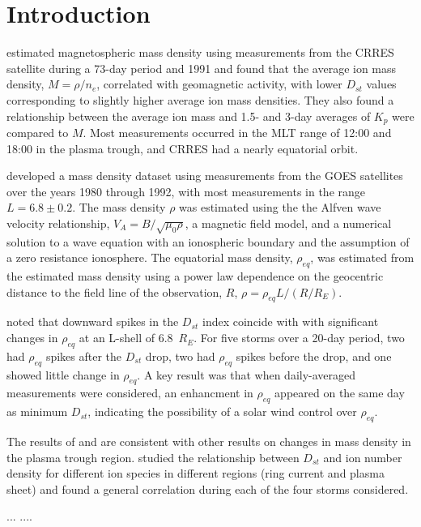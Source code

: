 \documentclass[10pt,twocolumn]{article}
\begin{document}
\section{Introduction}

\cite{Takahashi2006} estimated magnetospheric mass density using measurements from the CRRES satellite during a 73-day period and 1991 and found that the average ion mass density, $M=\rho/n_e$, correlated with geomagnetic activity, with lower $D_{st}$ values corresponding to slightly higher average ion mass densities.  They also found a relationship between the average ion mass and 1.5- and 3-day averages of $K_p$ were compared to $M$.  Most measurements occurred in the MLT range of 12:00 and 18:00 in the plasma trough, and CRRES had a nearly equatorial orbit.

\cite{Takahashi2010} developed a mass density dataset using measurements from the GOES satellites over the years 1980 through 1992, with most measurements in the range $L=6.8\pm0.2$. The mass density $\rho$ was estimated using the the Alfven wave velocity relationship, $V_A=B/\sqrt{\mu_0\rho}$, a magnetic field model, and a numerical solution to a wave equation with an ionospheric boundary and the assumption of a zero resistance ionosphere.  The equatorial mass density, $\rho_{eq}$, was estimated from the estimated mass density using a power law dependence on the geocentric distance to the field line of the observation, $R$, $\rho=\rho_{eq}L/(R/R_E)$. 

\cite{Takahashi2010} noted that downward spikes in the $D_{st}$ index coincide with with significant changes in $\rho_{eq}$ at an L-shell of 6.8~$R_E$. For five storms over a 20-day period, two had $\rho_{eq}$ spikes after the $D_{st}$ drop, two had $\rho_{eq}$ spikes before the drop, and one showed little change in $\rho_{eq}$.  A key result was that when daily-averaged measurements were considered, an enhancment in $\rho_{eq}$ appeared on the same day as minimum $D_{st}$, indicating the possibility of a solar wind control over $\rho_{eq}$.

The results of \cite{Takahashi2006} and \cite{Takahashi2010} are consistent with other results on changes in mass density in the plasma trough region.  \cite{Yao2008} studied the relationship between $D_{st}$ and ion number density for different ion species in different regions (ring current and plasma sheet) and found a general correlation during each of the four storms considered.

\cite{Hamilton1988} ... \cite{Gallagher1988} .... 
\end{document}
